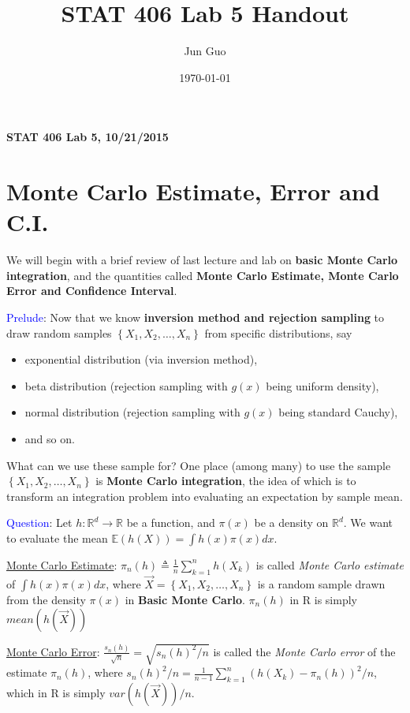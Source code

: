 \documentclass[12pt]{article}
\title{\textbf{STAT 406 Lab 5 Handout}}
\author{Jun Guo}
\date{\today}
\newcommand{\E}{\mathbb{E}}
\newcommand{\R}{\mathbb{R}}
\newcommand{\set}[1]{\left\{#1\right\}}
\newcommand{\paren}[1]{\left(#1\right)}
\numberwithin{equation}{subsection}
\begin{document}
\begin{center}
\large
\textbf{STAT 406 Lab 5, 10/21/2015}
\end{center}\vspace*{5mm}

\section{Monte Carlo Estimate, Error and C.I.}

We will begin with a brief review of last lecture and lab on \textbf{basic Monte Carlo integration}, and the quantities called \textbf{Monte Carlo Estimate, Monte Carlo Error and Confidence Interval}. \newline

\noindent
\textcolor{blue}{Prelude}:
Now that we know \textbf{inversion method and rejection sampling} to draw random samples $\set{X_1, X_2, \dots, X_n}$ from specific distributions, say 
\begin{itemize}
\item exponential distribution (via inversion method), 
\item beta distribution (rejection sampling with $g(x)$ being uniform density), 
\item normal distribution (rejection sampling with $g(x)$ being standard Cauchy),
\item and so on.
\end{itemize}
What can we use these sample for? One place (among many) to use the sample $\set{X_1, X_2, \dots, X_n}$ is
\textbf{Monte Carlo integration}, the idea of which is to transform an integration problem into evaluating an expectation by sample mean. \newline

\noindent
\textcolor{blue}{Question}: Let $h : \R^{d} \to \R$ be a function, and $\pi(x)$ be a density on $\R^{d}$. We want to evaluate the mean $\E\paren{h(X)} = \int h(x)\pi(x) dx$. \newline

\noindent
\underline{Monte Carlo Estimate}: $\pi_n\paren{h} \triangleq \frac{1}{n}\sum\limits_{k=1}^n{h(X_k)}$ is called \textit{Monte Carlo estimate} of $\int h(x)\pi(x) dx$, where $\vec{X} = \set{X_1, X_2, \dots, X_n}$ is a random sample drawn from the density $\pi(x)$ in \textbf{Basic Monte Carlo}. $\pi_n\paren{h}$ in R is simply $mean(h(\vec{X}))$\newline

\noindent
\underline{Monte Carlo Error}: $\frac{s_n\paren{h}}{\sqrt{n}} = \sqrt{s_n\paren{h}^2 / n}$ is called the \textit{Monte Carlo error} of the estimate $\pi_n\paren{h}$, where $s_n\paren{h}^2 / n = \frac{1}{n-1}\sum\limits_{k=1}^n\paren{h(X_k)-\pi_n(h)}^2 / n$, which in R is simply $var(h(\vec{X})) / n$. %
\end{document}
